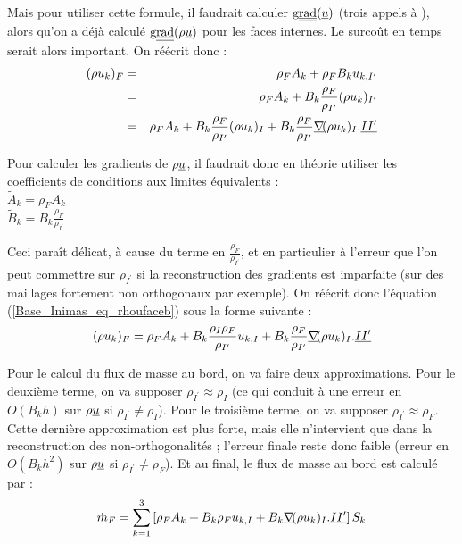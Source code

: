 Mais pour utiliser cette formule, il faudrait calculer $\text{g}\underline{\underline{{\text{rad}}}}\,\!(\underline{u})$ (trois
appels à ), alors qu'on a déjà calculé
$\text{g}\underline{\underline{{\text{rad}}}}\,\!(\rho\underline{u})$ pour les faces internes. Le surcoût en temps serait alors
important. On réécrit donc :
\begin{eqnarray}
(\rho u_k)_F & = & \rho_F A_k + \rho_F B_ku_{k,I^\prime}\\
& = & \rho_F A_k + B_k\frac{\rho_F}{\rho_{I^\prime}}(\rho u_k)_{I^\prime}
\label{Base_Inimas_eq_rhoufacea}\\
& = & \rho_F A_k + B_k\frac{\rho_F}{\rho_{I^\prime}}(\rho u_k)_I
+B_k\frac{\rho_F}{\rho_{I^\prime}}\underline{\nabla}\!(\rho u_k)_I.\underline{II^\prime}
\label{Base_Inimas_eq_rhoufaceb}
\end{eqnarray}

Pour calculer les gradients de $\rho\underline{u}$, il faudrait donc en théorie
utiliser les coefficients de conditions aux limites équivalents :\\
$\tilde{A}_k = \rho_F A_k$\\
$\displaystyle \tilde{B}_k = B_k\frac{\rho_F}{\rho_{I^\prime}}$

Ceci paraît délicat, à cause du terme en
$\displaystyle \frac{\rho_F}{\rho_{I^\prime}}$, et en particulier à l'erreur
que l'on peut commettre sur $\rho_{I^\prime}$ si la reconstruction des gradients
est imparfaite (sur des maillages fortement non orthogonaux par exemple).
On réécrit donc l'équation
(\ref{Base_Inimas_eq_rhoufaceb}) sous la forme suivante :
\begin{equation}
(\rho u_k)_F=\rho_F A_k + B_k\frac{\rho_I\rho_F}{\rho_{I^\prime}}u_{k,I}
+B_k\frac{\rho_F}{\rho_{I^\prime}}\underline{\nabla}\!(\rho u_k)_I.\underline{II^\prime}
\end{equation}


Pour le calcul du flux de masse au bord, on va faire deux approximations. Pour
le deuxième terme, on va supposer $\rho_{I^\prime}\approx\rho_I$ (ce qui
conduit à une erreur en $O(B_kh)$ sur $\rho\underline{u}$ si
$\rho_{I^\prime}\ne \rho_I$). Pour le
troisième terme, on va supposer $\rho_{I^\prime}\approx\rho_F$. Cette
dernière approximation est plus forte, mais elle n'intervient que dans la
reconstruction des non-orthogonalités ; l'erreur finale reste donc faible
(erreur en $O(B_kh^2)$ sur $\rho\underline{u}$ si
$\rho_{I^\prime}\ne \rho_F$).
Et au final, le flux de masse au bord est calculé par :
\begin{equation}
\dot{m}_F = \sum\limits_{k=1}^{3}\left[\rho_F A_k + B_k\rho_Fu_{k,I}
+B_k\underline{\nabla}\!(\rho u_k)_I.\underline{II^\prime}\right]S_k
\end{equation}

